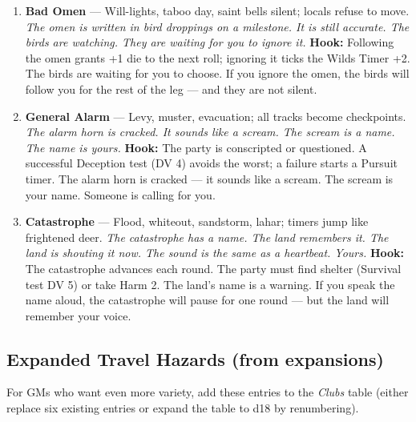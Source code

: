 \begin{enumerate}
\item[Q] \textbf{Bad Omen} --- Will-lights, taboo day, saint bells silent; locals refuse to move.
  \hfill \textit{The omen is written in bird droppings on a milestone. It is still accurate. The birds are watching. They are waiting for you to ignore it.}
  \textbf{Hook:} Following the omen grants +1 die to the next roll; ignoring it ticks the Wilds Timer +2. The birds are waiting for you to choose. If you ignore the omen, the birds will follow you for the rest of the leg --- and they are not silent.
  
\item[K] \textbf{General Alarm} --- Levy, muster, evacuation; all tracks become checkpoints.
  \hfill \textit{The alarm horn is cracked. It sounds like a scream. The scream is a name. The name is yours.}
  \textbf{Hook:} The party is conscripted or questioned. A successful Deception test (DV 4) avoids the worst; a failure starts a Pursuit timer. The alarm horn is cracked --- it sounds like a scream. The scream is your name. Someone is calling for you.
  
\item[A] \textbf{Catastrophe} --- Flood, whiteout, sandstorm, lahar; timers jump like frightened deer.
  \hfill \textit{The catastrophe has a name. The land remembers it. The land is shouting it now. The sound is the same as a heartbeat. Yours.}
  \textbf{Hook:} The catastrophe advances each round. The party must find shelter (Survival test DV 5) or take Harm 2. The land's name is a warning. If you speak the name aloud, the catastrophe will pause for one round --- but the land will remember your voice.
\end{enumerate}

\subsection*{Expanded Travel Hazards (from expansions)}
\label{sec:wilderness-expanded-hazards}
For GMs who want even more variety, add these entries to the \emph{Clubs} table (either replace six existing entries or expand the table to d18 by renumbering).

